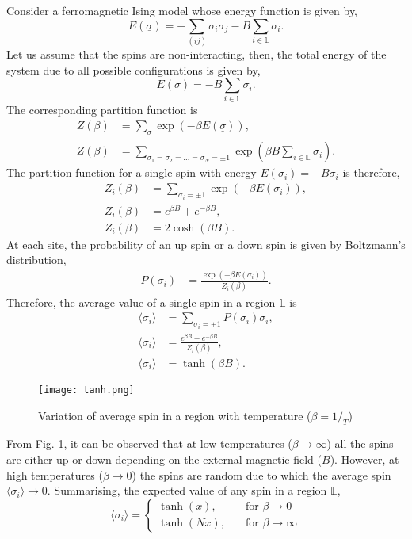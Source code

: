 \documentclass[letterpaper,english,12pt]{article}
\begin{document}
\begin{defn} Consider a ferromagnetic Ising model whose energy function is given by,
$$E(\underline{\sigma}) = -\sum_{(ij)}\sigma_{i}\sigma_{j} - B \sum_{i\in \mathbb{L}}\sigma_{i}.$$
Let us assume that the spins are non-interacting, then, the total energy of the system due to all possible configurations is given by,
\begin{equation}
E(\underline{\sigma}) = - B \sum_{i\in \mathbb{L}}\sigma_{i}.
\end{equation}
The corresponding partition function is
\begin{align}
Z(\beta) &= \sum_{\underline{\sigma}}\exp(-\beta E(\underline{\sigma})),\nonumber\\  
Z(\beta) &= \sum_{\sigma_{1}=\sigma_{2}=\ldots=\sigma_{N} = \pm 1}\exp(\beta B \sum_{i\in \mathbb{L}}\sigma_{i}).
\end{align}
The partition function for a single spin with energy            $E(\sigma_{i}) = -B\sigma_{i}$ is therefore,
\begin{align}
Z_{i}(\beta) &= \sum_{\sigma_{i} = \pm 1}\exp(-\beta E(\sigma_{i})),\nonumber\\  
Z_{i}(\beta) &= e^{\beta B}+ e^{-\beta B},\nonumber\\
Z_{i}(\beta) &= 2\cosh(\beta B).
\end{align}
At each site, the probability of an up spin or a down spin is given by Boltzmann's distribution,
\begin{align}
P(\sigma_{i}) &= \frac{\exp(-\beta E(\sigma_{i}))}{Z_{i}(\beta)}.
\end{align}
Therefore, the average value of a single spin in a region $\mathbb{L}$ is
\begin{align}
\langle\sigma_{i}\rangle &= \sum_{\sigma_{i}=\pm 1}P(\sigma_{i})\sigma_{i},\nonumber\\
\langle\sigma_{i}\rangle &= \frac{e^{\beta B}-e^{-\beta B}}{Z_{i}(\beta)},\nonumber\\
 \langle\sigma_{i}\rangle &= \tanh(\beta B).
\end{align}
\begin{figure}
\centering
\texttt{[image: tanh.png]}
\caption{Variation of average spin in a region with temperature ($\beta = 1/_T$)}
\end{figure}
From Fig. 1, it can be observed that at low temperatures ($\beta \to \infty$) all the spins are either up or down depending on the external magnetic field ($B$). However, at high temperatures ($\beta \to 0$) the spins are random due to which the average spin $\langle \sigma_{i}\rangle \to 0$. Summarising, the expected value of any spin in a region $\mathbb{L}$,	
	\[\langle\sigma_{i}\rangle =
	\begin{cases}
	\tanh(x), & \quad \text{for } \beta \to 0 \\
	\tanh(Nx), & \quad \text{for } \beta \to \infty
	\end{cases}	\]
\end{defn}
\end{document}
